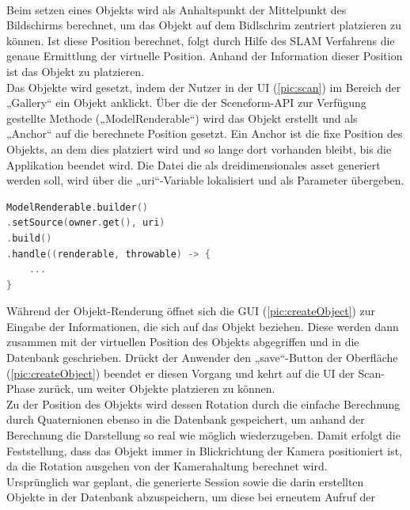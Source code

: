 \\ 
Beim setzen eines Objekts wird als Anhaltspunkt der Mittelpunkt des Bildschirms berechnet, um das Objekt auf dem Bidlschrim zentriert platzieren zu können. Ist 
diese Position berechnet, folgt durch Hilfe des \acs{SLAM} Verfahrens die genaue Ermittlung der virtuelle Position. Anhand der Information dieser Position 
ist das Objekt zu platzieren. 
\\ 
Das Objekte wird gesetzt, indem der Nutzer in der \acs{UI} (\ref{pic:scan}) im Bereich der „Gallery“ ein Objekt anklickt.
Über die der Sceneform-\acs{API} zur Verfügung gestellte Methode („ModelRenderable“) wird das Objekt erstellt und als „Anchor“ auf die berechnete Position 
gesetzt. Ein Anchor ist die fixe Position des Objekts, an dem dies platziert wird und so lange dort vorhanden bleibt, bis die Applikation beendet wird. Die Datei 
die als dreidimensionales asset generiert werden soll, wird über die „uri“-Variable lokalisiert und als Parameter übergeben. 
\begin{lstlisting}[language=C,
    frame=lines,           % Ein Rahmen um den Code (single for box, lines for top and bottom)
    xleftmargin=\parindent,  % Rahmen link von den Zahlen
    style=algoBericht,
    label={code:modelrenderable},
    captionpos=b,           % Caption unter den Code setzen
caption={ModelRenderable Builder}]
ModelRenderable.builder()
.setSource(owner.get(), uri)
.build()
.handle((renderable, throwable) -> {
    ...
}
\end{lstlisting}
Während der Objekt-Renderung öffnet sich die \acs{GUI} (\ref{pic:createObject}) zur Eingabe der Informationen, die sich auf das Objekt beziehen. Diese 
werden dann zusammen mit der virtuellen Position des Objekts abgegriffen und in die Datenbank geschrieben. Drückt der Anwender den „save“-Button der Oberfläche 
(\ref{pic:createObject}) beendet er diesen Vorgang und kehrt auf die \acs{UI} der Scan-Phase zurück, um weiter Objekte platzieren zu können. 
\\ 
Zu der Position des Objekts wird dessen Rotation durch die einfache Berechnung durch Quaternionen ebenso in die Datenbank gespeichert, um anhand der Berechnung 
die Darstellung so real wie möglich wiederzugeben. Damit erfolgt die Feststellung, dass das Objekt immer in Blickrichtung der Kamera positioniert ist, da die 
Rotation ausgehen von der Kamerahaltung berechnet wird. 
\\ 
\linebreak
Ursprünglich war geplant, die generierte Session sowie die darin erstellten Objekte in der Datenbank abzuspeichern, um diese bei erneutem Aufruf der 

